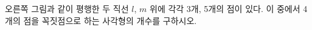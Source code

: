 \noindent\begin{minipage}[t]{0.58\linewidth}\vspace{0pt}\raggedright 오른쪽 그림과 같이 평행한 두 직선 $l$, $m$ 위에 각각 3개, 5개의 점이 있다. 이 중에서 4개의 점을 꼭짓점으로 하는 사각형의 개수를 구하시오.\end{minipage}\hfill\begin{minipage}[t]{0.4\linewidth}\vspace{0pt}\centering \resizebox{\ifdim\width>\linewidth\linewidth\else\width\fi}{!}{}\end{minipage}\par
